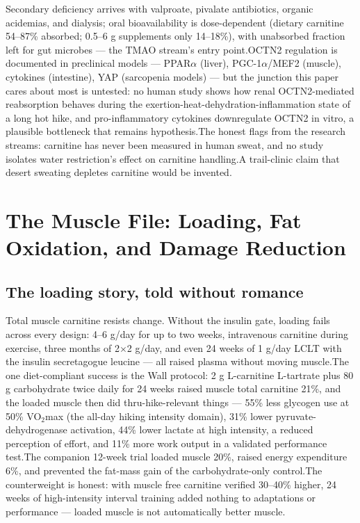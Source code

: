 \documentclass[11pt]{article}
\newcommand{\src}[1]{\allowbreak[#1]}
\begin{document}
Secondary deficiency arrives with valproate, pivalate antibiotics, organic acidemias, and dialysis; oral bioavailability is dose-dependent (dietary carnitine 54--87\% absorbed; 0.5--6 g supplements only 14--18\%), with unabsorbed fraction left for gut microbes --- the TMAO stream's entry point.\src{116}\src{123}\src{111}\src{107}\src{94} OCTN2 regulation is documented in preclinical models --- PPAR$\alpha$ (liver), PGC-1$\alpha$/MEF2 (muscle), cytokines (intestine), YAP (sarcopenia models) --- but the junction this paper cares about most is untested: no human study shows how renal OCTN2-mediated reabsorption behaves during the exertion-heat-dehydration-inflammation state of a long hot hike, and pro-inflammatory cytokines downregulate OCTN2 in vitro, a plausible bottleneck that remains hypothesis.\src{113}\src{110}\src{89}\src{102}\src{220} The honest flags from the research streams: carnitine has never been measured in human sweat, and no study isolates water restriction's effect on carnitine handling.\src{128} A trail-clinic claim that desert sweating depletes carnitine would be invented.

\section{The Muscle File: Loading, Fat Oxidation, and Damage Reduction}
\label{sec:muscle}

\subsection{The loading story, told without romance}

Total muscle carnitine resists change. Without the insulin gate, loading fails across every design: 4--6 g/day for up to two weeks, intravenous carnitine during exercise, three months of 2$\times$2 g/day, and even 24 weeks of 1 g/day LCLT with the insulin secretagogue leucine --- all raised plasma without moving muscle.\src{140}\src{160}\src{141}\src{162}\src{142} The one diet-compliant success is the Wall protocol: 2 g L-carnitine L-tartrate plus 80 g carbohydrate twice daily for 24 weeks raised muscle total carnitine 21\%, and the loaded muscle then did thru-hike-relevant things --- 55\% less glycogen use at 50\% VO$_2$max (the all-day hiking intensity domain), 31\% lower pyruvate-dehydrogenase activation, 44\% lower lactate at high intensity, a reduced perception of effort, and 11\% more work output in a validated performance test.\src{135}\src{14} The companion 12-week trial loaded muscle 20\%, raised energy expenditure 6\%, and prevented the fat-mass gain of the carbohydrate-only control.\src{136} The counterweight is honest: with muscle free carnitine verified 30--40\% higher, 24 weeks of high-intensity interval training added nothing to adaptations or performance --- loaded muscle is not automatically better muscle.\src{143}
\end{document}
